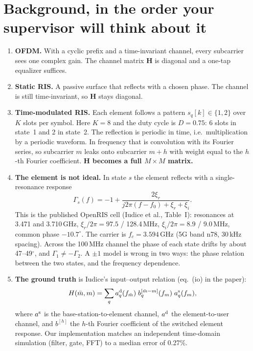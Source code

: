 \documentclass[11pt,a4paper]{article}
\begin{document}
\section{Background, in the order your supervisor will think about it}
\begin{enumerate}
\item \textbf{OFDM.} With a cyclic prefix and a time-invariant channel, every subcarrier sees one complex gain. The channel
matrix $\bm H$ is diagonal and a one-tap equalizer suffices.
\item \textbf{Static RIS.} A passive surface that reflects with a chosen phase. The channel is still time-invariant, so
$\bm H$ stays diagonal.
\item \textbf{Time-modulated RIS.} Each element follows a pattern $s_q[k]\in\{1,2\}$ over $K$ slots per symbol. Here
$K=8$ and the duty cycle is $D=0.75$: 6 slots in state~1 and 2 in state~2. The reflection is periodic in time, i.e.\
multiplication by a periodic waveform. In frequency that is convolution with its Fourier series, so subcarrier $m$ leaks
onto subcarrier $m+h$ with weight equal to the $h$-th Fourier coefficient. \textbf{$\bm H$ becomes a full $M\times M$
matrix.}
\item \textbf{The element is not ideal.} In state $s$ the element reflects with a single-resonance response
\[ \Gamma_s(f) = -1 + \frac{2\xi_r}{j2\pi(f-f_0)+\xi_r+\xi_i}. \]
This is the published OpenRIS cell (Iudice et al., Table~I): resonances at 3.471 and 3.710\,GHz, $\xi_r/2\pi = 97.5$ /
128.4\,MHz, $\xi_i/2\pi = 8.9$ / 9.0\,MHz, common phase $-10.7^\circ$. The carrier is $f_c=3.594$\,GHz (5G band n78,
30\,kHz spacing). Across the 100\,MHz channel the phase of each state drifts by about 47--49$^\circ$, and $\Gamma_1\neq
-\Gamma_2$. A $\pm1$ model is wrong in two ways: the phase relation between the two states, and the frequency dependence.
\item \textbf{The ground truth} is Iudice's input--output relation (eq.~(io) in the paper):
\[ H(\bar m, m) = \sum_q a^{\rm d}_q(f_{\bar m})\; b_q^{[\bar m-m]}(f_m)\; a^{\rm s}_q(f_m), \]
where $a^{\rm s}$ is the base-station-to-element channel, $a^{\rm d}$ the element-to-user channel, and $b^{[h]}$ the
$h$-th Fourier coefficient of the switched element response. Our implementation matches an independent time-domain
simulation (filter, gate, FFT) to a median error of 0.27\%.
\end{enumerate}
\end{document}
